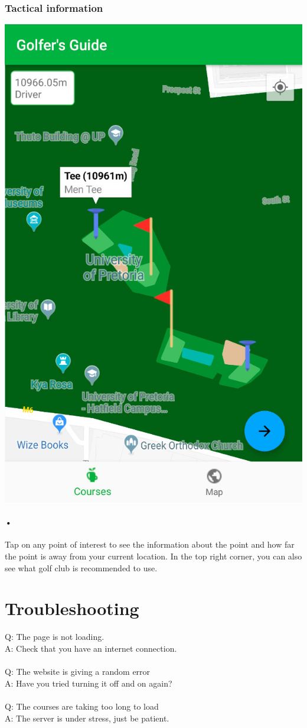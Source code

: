\documentclass{article}
\begin{document}
	\subsubsection{Tactical information}
	\includegraphics[scale=0.7]{4_info}
	\paragraph{•}
	Tap on any point of interest to see the information about the point and how far the point is away from your current location. In the top right corner, you can also see what golf club is recommended to use.	

	
	\section{Troubleshooting}
	
	Q: The page is not loading.
	\\
	A: Check that you have an internet connection.
	\\
	\\
	Q: The website is giving a random error
	\\
	A: Have you tried turning it off and on again?
	\\
	\\
	Q: The courses are taking too long to load
	\\
	A: The server is under stress, just be patient.
	
	

	
	
\end{document}
